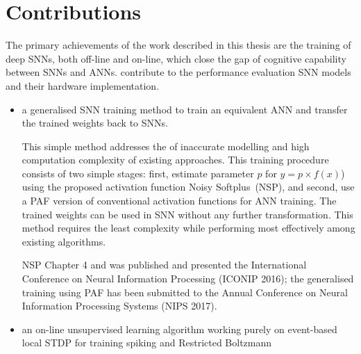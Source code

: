 \section{Contributions}
The primary achievements of the work described in this thesis are the training of deep SNNs, both off-line and on-line, which close the gap of cognitive capability between SNNs and ANNs.
\protect{}
\protect{} contribute to the performance evaluation \protect{} \protect{} SNN models and their hardware implementation.
\protect{}
\begin{itemize}

	\item 
	a generalised SNN training method to train an equivalent ANN and transfer the trained weights back to SNNs.
	
	This simple method addresses the \protect{} \protect{} of inaccurate modelling and high computation complexity of existing approaches.
	This training procedure consists of two simple stages: first, estimate parameter $p$ for \protect{} \protect{} $y = p \times f(x)$) using the proposed activation function Noisy Softplus~(NSP), and second, use a PAF version of conventional activation functions for ANN training. The trained weights can be \protect{} used \protect{} in \protect{} SNN without any further transformation.
	This method requires the least \protect{} \protect{} complexity while performing most effectively among existing algorithms.


	\protect{}


	NSP \protect{} \protect{} Chapter 4 and was published and presented \protect{} \protect{} the International Conference on Neural Information Processing (ICONIP 2016);
	the generalised \protect{} training using PAF \protect{} has been submitted to the Annual Conference on Neural Information Processing Systems (NIPS 2017).

	\item 
	an on-line unsupervised learning algorithm working purely on event-based local STDP for training spiking \protect{} \protect{} and Restricted Boltzmann \protect{} \protect{}
	

\end{itemize}
